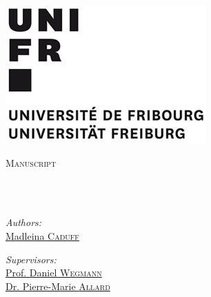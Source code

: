 \documentclass[
11pt, %
oneside, %
english, %
singlespacing, %
headsepline, %
chapterinoneline, %
]{MastersDoctoralThesis} %
\author{Marco \textsc{Visani}} %
\begin{document}
\frontmatter %

\pagestyle{plain} %


\begin{titlepage}
\includegraphics[scale=0.3]{images/UnifrLogo} %
\begin{center}
\vspace*{.06\textheight}
{\scshape\LARGE \univname\par}\vspace{1.5cm} %

\textsc{\Large Manuscript}\\[0.5cm] %

\HRule \\[0.4cm] %
{\huge \bfseries \ttitle\par}\vspace{0.4cm} %
\HRule \\[1.5cm] %
 
\begin{minipage}[t]{0.4\textwidth}
\begin{flushleft} \large
\emph{Authors:}\\
\href{mailto:madleina.caduff@unifr.ch}{Madleina \textsc{Caduff}}\\
\href{mailto:contact@vismarco.ch}{\authorname} %
\end{flushleft}
\end{minipage}
\begin{minipage}[t]{0.4\textwidth}
\begin{flushright} \large
\emph{Supervisors:} \\
\href{mailto:daniel.wegmann@unifr.ch}{Prof. Daniel \textsc{Wegmann}} \\
\href{mailto:pierre-marie.allard@unifr.ch}{Dr. Pierre-Marie \textsc{Allard}}%
\end{flushright}
\end{minipage}\\[3cm]
 

\end{center}
\end{titlepage}
\end{document}
